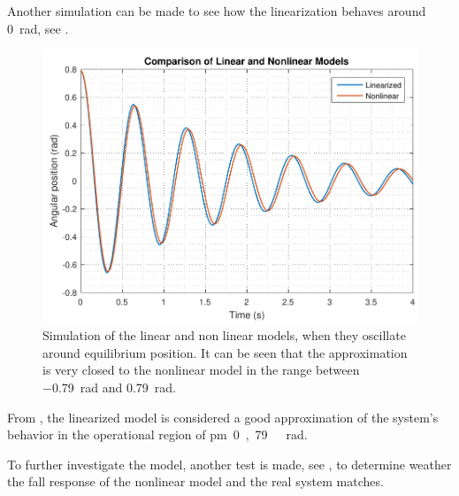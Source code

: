 Another simulation can be made to see how the linearization behaves around \SI{0}{rad}, see .

\begin{figure}[H] 
	\centering 
	\includegraphics[scale=0.6]{figures/LinearizedVSNonlinear_0}
	\caption{Simulation of the linear and non linear models, when they oscillate around equilibrium position. It can be seen that the approximation is very closed to the nonlinear model in the range between \SI{-0,79}{rad} and \SI{0,79}{rad}.}
	\label{LinearizedVSNonlinear_0}
\end{figure}

From , the linearized model is considered a good approximation of the system's behavior in the operational region of \si{\pm 0,79\ rad}.

To further investigate the model, another test is made, see , to determine weather the fall response of the nonlinear model and the real system matches.

